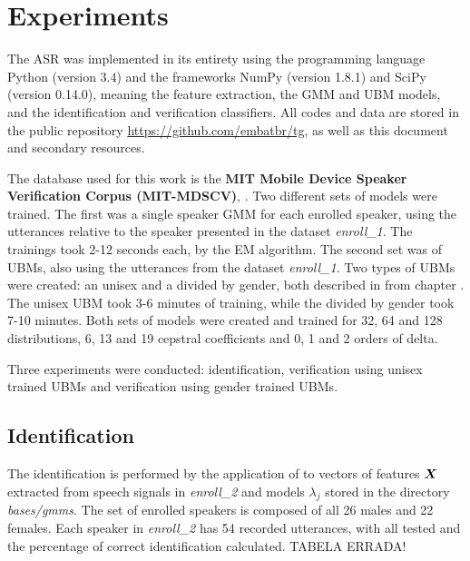 \chapter{Experiments}
\label{ch:experiments}

The ASR was implemented in its entirety using the programming language Python (version 3.4) and the frameworks NumPy (version 1.8.1) and SciPy (version 0.14.0), meaning the feature extraction, the GMM and UBM models, and the identification and verification classifiers. All codes and data are stored in the public repository \url{https://github.com/embatbr/tg}, as well as this document and secondary resources.

The database used for this work is the \textbf{MIT Mobile Device Speaker Verification Corpus (MIT-MDSCV)}, . Two different sets of models were trained. The first was a single speaker GMM for each enrolled speaker, using the utterances relative to the speaker presented in the dataset \textit{enroll\_1}. The trainings took 2-12 seconds each, by the EM algorithm. The second set was of UBMs, also using the utterances from the dataset \textit{enroll\_1}. Two types of UBMs were created: an unisex and a divided by gender, both described in  from chapter . The unisex UBM took 3-6 minutes of training, while the divided by gender took 7-10 minutes. Both sets of models were created and trained for 32, 64 and 128 distributions, 6, 13 and 19 cepstral coefficients and 0, 1 and 2 orders of delta.

Three experiments were conducted: identification, verification using unisex trained UBMs and verification using gender trained UBMs.

\section{Identification}

The identification is performed by the application of  to vectors of features $\boldsymbol{X}$ extracted from speech signals in \textit{enroll\_2} and models $\lambda_j$ stored in the directory \textit{bases/gmms}. The set of enrolled speakers is composed of all 26 males and 22 females. Each speaker in \textit{enroll\_2} has 54 recorded utterances, with all tested and the percentage of correct identification calculated. TABELA ERRADA!

